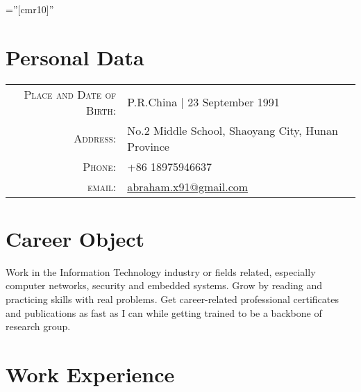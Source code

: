 \documentclass[a4paper,10pt]{article} %
\begin{document}
\pagestyle{empty} %

\font\fb=''[cmr10]'' %


\par{\bigskip\par} %

\section{Personal Data}

\begin{tabular}{rl}
\textsc{Place and Date of Birth:} & P.R.China  | 23 September 1991 \\
\textsc{Address:} & No.2 Middle School, Shaoyang City, Hunan Province\\
\textsc{Phone:} & +86 18975946637\\
\textsc{email:} & \href{mailto:abraham.x91@gmail.com}{abraham.x91@gmail.com}
\end{tabular}


\section{Career Object}
\label{sec:career-object}
Work in the Information Technology industry or fields related,
especially computer networks, security and embedded systems. Grow by
reading and practicing skills with real problems. Get career-related
professional certificates and publications as fast as I can while
getting trained to be a backbone of research group.





\section{Work Experience}
\end{document}
